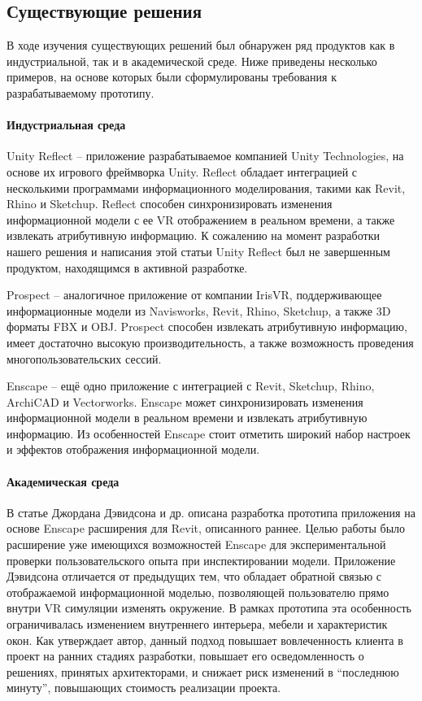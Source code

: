 ﻿\subsection{Существующие решения}
\label{subsections:ExistingSolutions}

В ходе изучения существующих решений был обнаружен ряд продуктов
как в индустриальной, так и в академической среде.
Ниже приведены несколько примеров,
на основе которых были сформулированы требования к разрабатываемому прототипу.

\paragraph{Индустриальная среда}

Unity Reflect -- приложение разрабатываемое компанией Unity Technologies,
на основе их игрового фреймворка Unity.%
\cite{UnityReflect}
Reflect обладает интеграцией с несколькими программами информационного моделирования,
такими как Revit, Rhino и Sketchup.
Reflect способен синхронизировать изменения информационной модели с
ее VR отображением в реальном времени, а также извлекать атрибутивную информацию.
К сожалению на момент разработки нашего решения и написания этой статьи
Unity Reflect был не завершенным продуктом, находящимся в активной разработке.

Prospect -- аналогичное приложение от компании IrisVR,
поддерживающее информационные модели
из Navisworks, Revit, Rhino, Sketchup, а также 3D форматы FBX и OBJ.%
\cite{IrisVR}
Prospect способен извлекать атрибутивную информацию,
имеет достаточно высокую производительность,
а также возможность проведения многопользовательских сессий.

Enscape -- ещё одно приложение с интеграцией
с Revit, Sketchup, Rhino, ArchiCAD и Vectorworks.%
\cite{Enscape}
Enscape может синхронизировать изменения информационной модели в реальном времени
и извлекать атрибутивную информацию.
Из особенностей Enscape стоит отметить широкий набор
настроек и эффектов отображения информационной модели.

\paragraph{Академическая среда}

В статье Джордана Дэвидсона и др. описана разработка прототипа приложения
на основе Enscape расширения для Revit, описанного раннее.%
\cite{Davidson2019}
Целью работы было расширение уже имеющихся возможностей Enscape
для экспериментальной проверки пользовательского опыта при инспектировании модели.
Приложение Дэвидсона отличается от предыдущих тем,
что обладает обратной связью с отображаемой информационной моделью,
позволяющей пользователю прямо внутри VR симуляции изменять окружение.
В рамках прототипа эта особенность ограничивалась изменением
внутреннего интерьера, мебели и характеристик окон.
Как утверждает автор, данный подход повышает вовлеченность
клиента в проект на ранних стадиях разработки,
повышает его осведомленность о решениях, принятых архитекторами,
и снижает риск изменений в ``последнюю минуту'',
повышающих стоимость реализации проекта.

